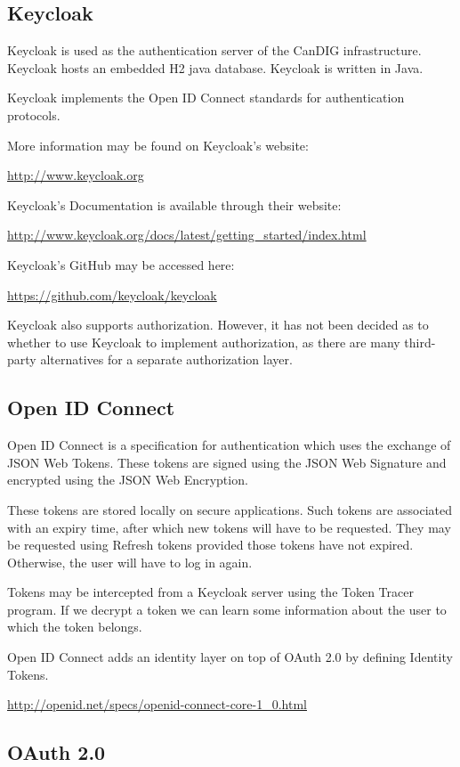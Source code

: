 \documentclass{article}
\begin{document}
\subsection{Keycloak}

Keycloak is used as the authentication server of the CanDIG infrastructure.
Keycloak hosts an embedded H2 java database.
Keycloak is written in Java.

Keycloak implements the Open ID Connect standards for authentication protocols.

More information may be found on Keycloak's website:

\url{http://www.keycloak.org}

Keycloak's Documentation is available through their website:

\url{http://www.keycloak.org/docs/latest/getting_started/index.html}

Keycloak's GitHub may be accessed here:

\url{https://github.com/keycloak/keycloak}

Keycloak also supports authorization. However, it has not been decided as to whether to use Keycloak to implement authorization, as there are many third-party alternatives for a separate authorization layer.

\subsection{Open ID Connect}

Open ID Connect is a specification for authentication
which uses the exchange of JSON Web Tokens.
These tokens are signed using the JSON Web Signature
and encrypted using the JSON Web Encryption.

These tokens are stored locally on secure applications.
Such tokens are associated with an expiry time, after which
new tokens will have to be requested.
They may be requested using Refresh tokens provided
those tokens have not expired. Otherwise, the user 
will have to log in again.

Tokens may be intercepted from a Keycloak server using the Token Tracer program. If we decrypt a token we can learn some information about the user to which the token belongs.

Open ID Connect adds an identity layer on top of OAuth 2.0 
by defining Identity Tokens.

\url{http://openid.net/specs/openid-connect-core-1_0.html}

\subsection{OAuth 2.0}
\end{document}
